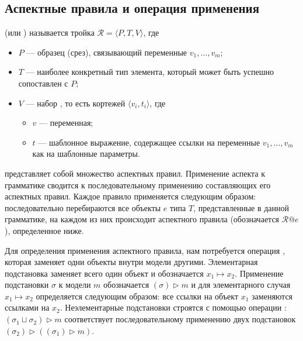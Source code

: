 \subsection{Аспектные правила и операция применения}

\begin{Def}
 (или ) называется тройка
$\mathcal{R} = \langle P, T, V \rangle$, где
\begin{itemize}
\item $P$ --- образец (срез), связывающий переменные $v_1,\ldots,v_m$;
\item $T$ --- наиболее конкретный тип элемента, который может быть успешно сопоставлен с $P$;
\item $V$ --- набор , то есть кортежей $\langle v_i, t_i \rangle$, где
	\begin{itemize}
		\item $v$ --- переменная;
		\item $t$ --- шаблонное выражение, содержащее ссылки на переменные $v_1,\ldots,v_m$ как на шаблонные параметры.
	\end{itemize}
\end{itemize}
\end{Def}
\newcommand{\rapply}[2]{#1@#2}
 представляет собой множество аспектных правил. Применение аспекта к грамматике сводится к последовательному применению составляющих его аспектных правил. Каждое правило применяется следующим образом: последовательно перебираются все объекты $e$ типа $T$, представленные в данной грамматике, на каждом из них происходит  аспектного правила (обозначается $\rapply{\mathcal{R}}{e}$), определенное ниже.

\newcommand{\subst}[2]{ #1 \mapsto #2 }
\newcommand{\apply}[2]{\left( #1 \right) \triangleright #2}
Для определения применения аспектного правила, нам потребуется операция , которая заменяет одни объекты внутри модели другими. Элементарная подстановка заменяет всего один объект и обозначается $\subst{x_1}{x_2}$. Применение подстановки $\sigma$ к модели $m$ обозначается $\apply{\sigma}{m}$ и для элементарного случая $\subst{x_1}{x_2}$ определяется следующим образом: все ссылки на объект $x_1$ заменяются ссылками на $x_2$.
Неэлементарные подстановки строятся с помощью операции : $\apply{\sigma_1 \sqcup \sigma_2}{m}$ соответствует последовательному применению двух подстановок $\apply{\sigma_2}{\left( \apply{\sigma_1}{m} \right)}$.

